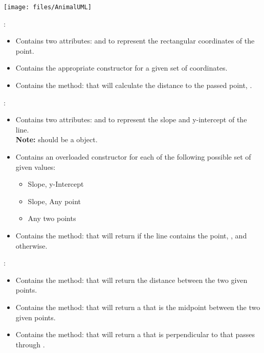 \begin{questions}
    \begin{center}
      \texttt{[image: files/AnimalUML]}
    \end{center}

    \pagebreak

    :
    \begin{itemize}
      \item Contains two attributes:  and  to represent the rectangular coordinates of the point.
      \item Contains the appropriate constructor for a given set of coordinates.
      \item Contains the method:  that will calculate the distance to the passed point, .
    \end{itemize}

    :
    \begin{itemize}
      \item Contains two attributes:  and  to represent the slope and y-intercept of the line.\\
      {\small\textbf{Note:}  should be a  object.}
      \item Contains an overloaded constructor for each of the following possible set of given values:
      \begin{itemize}
        \item Slope, y-Intercept
        \item Slope, Any point
        \item Any two points
      \end{itemize}
      \item Contains the method:  that will return  if the line contains the point, , and  otherwise.
    \end{itemize}

    :
    \begin{itemize}
      \item Contains the method:  that will return the distance between the two given points.
      \item Contains the method:  that will return a  that is the midpoint between the two given points.
      \item Contains the method:  that will return a  that is perpendicular to  that passes through .
    \end{itemize}
  \end{questions}

